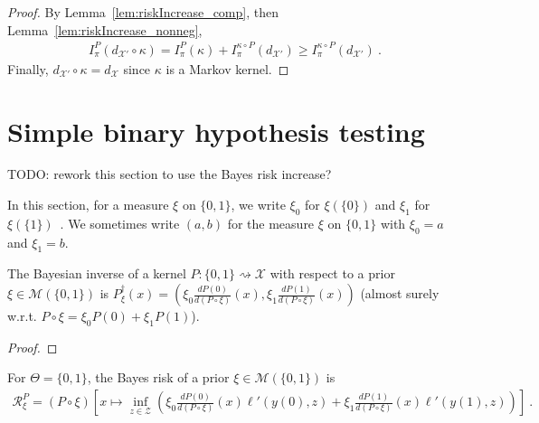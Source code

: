 \begin{proof}\leanok
{}
By Lemma~\ref{lem:riskIncrease_comp}, then Lemma~\ref{lem:riskIncrease_nonneg},
\begin{align*}
I_\pi^P(d_{\mathcal X'} \circ \kappa)
= I^P_\pi(\kappa) + I^{\kappa \circ P}_\pi(d_{\mathcal X'})
\ge I_\pi^{\kappa \circ P}(d_{\mathcal X'})
\: .
\end{align*}
Finally, $d_{\mathcal X'} \circ \kappa = d_{\mathcal X}$ since $\kappa$ is a Markov kernel.
\end{proof}




\section{Simple binary hypothesis testing}

TODO: rework this section to use the Bayes risk increase?

In this section, for a measure $\xi$ on $\{0,1\}$, we write $\xi_0$ for $\xi(\{0\})$ and $\xi_1$ for $\xi(\{1\})$~. We sometimes write $(a,b)$ for the measure $\xi$ on $\{0,1\}$ with $\xi_0 = a$ and $\xi_1 = b$.

\begin{lemma}
  \label{lem:bayesInv_binary}
  \leanok
  The Bayesian inverse of a kernel $P : \{0,1\} \rightsquigarrow \mathcal X$ with respect to a prior $\xi \in \mathcal M(\{0,1\})$ is $P_\xi^\dagger(x) = \left(\xi_0\frac{d P(0)}{d(P \circ \xi)}(x), \xi_1\frac{d P(1)}{d(P \circ \xi)}(x)\right)$ (almost surely w.r.t. $P \circ \xi = \xi_0 P(0) + \xi_1 P(1)$).
\end{lemma}

\begin{proof}%
{}

\end{proof}

\begin{lemma}
  \label{lem:bayesRisk_binary}
  For $\Theta = \{0,1\}$, the Bayes risk of a prior $\xi \in \mathcal M(\{0,1\})$ is
  \begin{align*}
  \mathcal R^P_\xi = (P \circ \xi)\left[x \mapsto \inf_{z \in \mathcal Z} \left( \xi_0\frac{d P(0)}{d(P \circ \xi)}(x)\ell'(y(0), z) + \xi_1\frac{d P(1)}{d(P \circ \xi)}(x)\ell'(y(1), z) \right) \right]
  \: .
  \end{align*}
\end{lemma}

